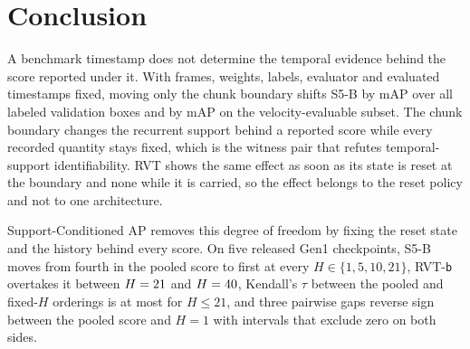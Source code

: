 \documentclass[10pt,twocolumn,letterpaper]{article}
\begin{document}
\section{Conclusion}

A benchmark timestamp does not determine the temporal evidence behind the score reported under it. With frames, weights, labels, evaluator and evaluated timestamps fixed, moving only the chunk boundary shifts S5-B by \ssmPairedMapAllBase{} mAP over all labeled validation boxes and by \ssmPairedMapVelBase{} mAP on the velocity-evaluable subset. The chunk boundary changes the recurrent support behind a reported score while every recorded quantity stays fixed, which is the witness pair that refutes temporal-support identifiability. RVT shows the same effect as soon as its state is reset at the boundary and none while it is carried, so the effect belongs to the reset policy and not to one architecture.

Support-Conditioned AP removes this degree of freedom by fixing the reset state and the history behind every score. On five released Gen1 checkpoints, S5-B moves from fourth in the pooled score to first at every $H\in\{1,5,10,21\}$, RVT-\texttt{b} overtakes it between $H=21$ and $H=40$, Kendall's $\tau$ between the pooled and fixed-$H$ orderings is at most \lhTauHTwentyone{} for $H\le21$, and three pairwise gaps reverse sign between the pooled score and $H=1$ with intervals that exclude zero on both sides.
\end{document}
